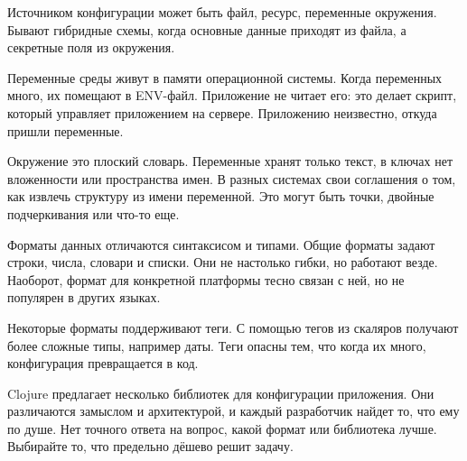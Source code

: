 Источником конфигурации может быть файл, ресурс, переменные окружения. Бывают
гибридные схемы, когда основные данные приходят из файла, а секретные поля из
окружения.

Переменные среды живут в памяти операционной системы. Когда переменных много, их
помещают в ENV-файл. Приложение не читает его: это делает скрипт, который
управляет приложением на сервере. Приложению неизвестно, откуда пришли
переменные.

Окружение это плоский словарь. Переменные хранят только текст, в ключах нет
вложенности или пространства имен. В разных системах свои соглашения о том, как
извлечь структуру из имени переменной. Это могут быть точки, двойные
подчеркивания или что-то еще.

Форматы данных отличаются синтаксисом и типами. Общие форматы задают строки,
числа, словари и списки. Они не настолько гибки, но работают везде. Наоборот,
формат для конкретной платформы тесно связан с ней, но не популярен в других
языках.

Некоторые форматы поддерживают теги. С помощью тегов из скаляров получают более
сложные типы, например даты. Теги опасны тем, что когда их много, конфигурация
превращается в код.

Clojure предлагает несколько библиотек для конфигурации приложения. Они
различаются замыслом и архитектурой, и каждый разработчик найдет то, что ему по
душе. Нет точного ответа на вопрос, какой формат или библиотека лучше. Выбирайте
то, что предельно д\"{е}шево решит задачу.
